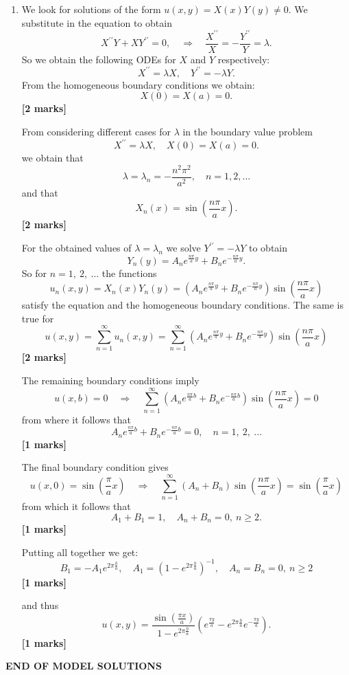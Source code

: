\documentclass[11pt,a4paper]{article}
\newcommand{\mrk}[1]{\hfill\textbf{[#1 marks]}}
\begin{document}
\begin{enumerate}
$$\begin{cases}
			0 & k - \text{odd},\\
			\frac{2k}{\pi(k^2 - 1)} & k - \text{even}.
		\end{cases}
		$$
		\mrk{3}\par
		Thus, the Fourier series for $f(x)$ is
		$$
		f(x) = \frac{1}{2}\cos x + \sum_{k - \text{even}}\frac{2k}{\pi(k^2 - 1)}\sin kx.
		$$
		\mrk{2}
		\item We look for solutions of the form $u(x, y) = X(x)Y(y) \neq 0$. We substitute in the equation to obtain
		$$
		X^{\prime\prime}Y + XY^{\prime\prime} = 0,\quad \Longrightarrow\quad \frac{X^{\prime\prime}}{X} = -\frac{Y^{\prime\prime}}{Y} = \lambda.
		$$
		So we obtain the following ODEs for $X$ and $Y$ respectively:
		$$
		X^{\prime\prime} = \lambda X,\quad Y^{\prime\prime} = -\lambda Y.
		$$
		From the homogeneous boundary conditions we obtain:
		$$
		X(0) = X(a) = 0.
		$$
		\mrk{2}\par
		From considering different cases for $\lambda$ in the boundary value problem
		$$
		X^{\prime\prime} = \lambda X,\quad X(0) = X(a) = 0.
		$$
		we obtain that
		$$
		\lambda = \lambda_n = -\frac{n^2\pi^2}{a^2},\quad n = 1,2,\ldots
		$$
		and that
		$$
		X_n(x) = \sin\left(\frac{n\pi}{a}x\right).
		$$
		\mrk{2}\par
		For the obtained values of $\lambda = \lambda_n$ we solve $Y^{\prime\prime} = -\lambda Y$ to obtain
		$$
		Y_n(y) = A_ne^{\frac{n\pi}{a}y} + B_ne^{-\frac{n\pi}{a}y}.
		$$
		So for $n = 1,\ 2,\ \ldots$ the functions
		$$
		u_n(x, y) = X_n(x)Y_n(y) = \left(A_ne^{\frac{n\pi}{a}y} + B_ne^{-\frac{n\pi}{a}y}\right)\sin\left(\frac{n\pi}{a}x\right)
		$$
		satisfy the equation and the homogeneous boundary conditions. The same is true for
		$$
		u(x, y) = \sum_{n = 1}^\infty u_n(x, y) = \sum_{n = 1}^\infty\left(A_ne^{\frac{n\pi}{a}y} + B_ne^{-\frac{n\pi}{a}y}\right)\sin\left(\frac{n\pi}{a}x\right)
		$$
		\mrk{2}\par
		The remaining boundary conditions imply
		$$
		u(x, b) = 0\quad \Longrightarrow \quad \sum_{n = 1}^\infty\left(A_ne^{\frac{n\pi}{a}b} + B_ne^{-\frac{n\pi}{a}b}\right)\sin\left(\frac{n\pi}{a}x\right) = 0
		$$
		from where it follows that
		$$
		A_ne^{\frac{n\pi}{a}b} + B_ne^{-\frac{n\pi}{a}b} = 0,\quad n = 1,\ 2,\ \ldots
		$$
		\mrk{1}\par
		The final boundary condition gives
		$$
		u(x, 0) = \sin\left(\frac{\pi}{a}x\right) \quad \Longrightarrow \quad \sum_{n = 1}^\infty (A_n + B_n)\sin\left(\frac{n\pi}{a}x\right) = \sin\left(\frac{\pi}{a}x\right)
		$$
		from which it follows that
		$$
		A_1 + B_1 = 1,\quad A_n + B_n = 0,\ n \geq 2.
		$$
		\mrk{1}\par
		Putting all together we get:
		$$
		B_1 = -A_1e^{2\pi\frac{b}{a}},\quad A_1 = (1 - e^{2\pi\frac{b}{a}})^{-1},\quad A_n = B_n = 0,\ n \geq 2
		$$
		\mrk{1}\par
		and thus
		$$
		u(x, y) = \frac{\sin\left(\frac{\pi x}{a}\right)}{1 - e^{2\pi\frac{b}{a}}}\left(e^{\frac{\pi y}{a}} - e^{2\pi \frac{b}{a}}e^{-\frac{\pi y}{a}}\right).
		$$
		\mrk{1}
	\end{enumerate}
	\vfill\centering\textbf{END OF MODEL SOLUTIONS}
\end{document}
